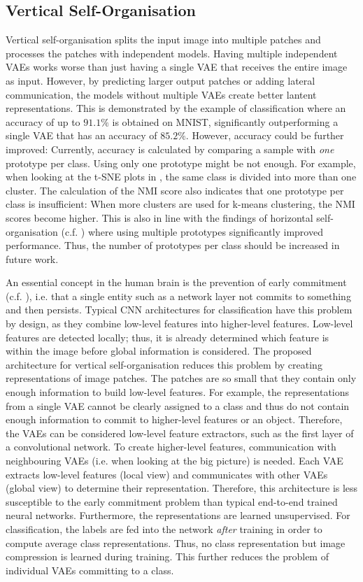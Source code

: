 \subsection{Vertical Self-Organisation}
Vertical self-organisation splits the input image into multiple patches and processes the patches with independent models. Having multiple independent VAEs works worse than just having a single VAE that receives the entire image as input. However, by predicting larger output patches or adding lateral communication, the models without multiple VAEs create better lantent representations. This is demonstrated by the example of classification where an accuracy of up to $91.1\%$ is obtained on MNIST, significantly outperforming a single VAE that has an accuracy of $85.2\%$.
However, accuracy could be further improved: Currently, accuracy is calculated by comparing a sample with \emph{one} prototype per class. Using only one prototype might be not enough. For example, when looking at the t-SNE plots in , the same class is divided into more than one cluster. The calculation of the NMI score also indicates that one prototype per class is insufficient: When more clusters are used for k-means clustering, the NMI scores become higher. This is also in line with the findings of horizontal self-organisation (c.f. ) where using multiple prototypes significantly improved performance. Thus, the number of prototypes per class should be increased in future work.

An essential concept in the human brain is the prevention of early commitment  (c.f. ), i.e. that a single entity such as a network layer not commits to something and then persists. Typical CNN architectures for classification have this problem by design, as they combine low-level features into higher-level features. Low-level features are detected locally; thus, it is already determined which feature is within the image before global information is considered. The proposed architecture for vertical self-organisation reduces this problem by creating representations of image patches. The patches are so small that they contain only enough information to build low-level features. For example, the representations from a single VAE cannot be clearly assigned to a class and thus do not contain enough information to commit to higher-level features or an object. Therefore, the VAEs can be considered low-level feature extractors, such as the first layer of a convolutional network. To create higher-level features, communication with neighbouring VAEs (i.e. when looking at the big picture) is needed. Each VAE extracts low-level features (local view) and communicates with other VAEs (global view) to determine their representation. Therefore, this architecture is less susceptible to the early commitment problem than typical end-to-end trained neural networks.
Furthermore, the representations are learned unsupervised. For classification, the labels are fed into the network \emph{after} training in order to compute average class representations. Thus, no class representation but image compression is learned during training. This further reduces the problem of individual VAEs committing to a class.

